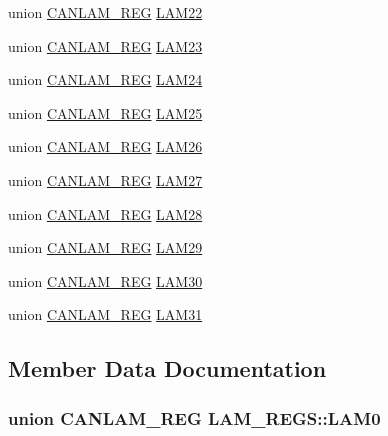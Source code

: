 \begin{DoxyCompactItemize}
\item 
union \hyperlink{union_c_a_n_l_a_m___r_e_g}{C\+A\+N\+L\+A\+M\+\_\+\+R\+E\+G} \hyperlink{struct_l_a_m___r_e_g_s_a5d4097e9a5e27410616af82cd72f3792}{L\+A\+M22}
\item 
union \hyperlink{union_c_a_n_l_a_m___r_e_g}{C\+A\+N\+L\+A\+M\+\_\+\+R\+E\+G} \hyperlink{struct_l_a_m___r_e_g_s_ab6407b6a2bb332f8d3a0170146206432}{L\+A\+M23}
\item 
union \hyperlink{union_c_a_n_l_a_m___r_e_g}{C\+A\+N\+L\+A\+M\+\_\+\+R\+E\+G} \hyperlink{struct_l_a_m___r_e_g_s_a76643c85fd7030cd2daefac17493515e}{L\+A\+M24}
\item 
union \hyperlink{union_c_a_n_l_a_m___r_e_g}{C\+A\+N\+L\+A\+M\+\_\+\+R\+E\+G} \hyperlink{struct_l_a_m___r_e_g_s_a4e4d712c5c62476fecb29037c0195af9}{L\+A\+M25}
\item 
union \hyperlink{union_c_a_n_l_a_m___r_e_g}{C\+A\+N\+L\+A\+M\+\_\+\+R\+E\+G} \hyperlink{struct_l_a_m___r_e_g_s_a73fbf03a4830bf03dc435bde77df4862}{L\+A\+M26}
\item 
union \hyperlink{union_c_a_n_l_a_m___r_e_g}{C\+A\+N\+L\+A\+M\+\_\+\+R\+E\+G} \hyperlink{struct_l_a_m___r_e_g_s_ad13a0dad0f417c1a0b8eef18da499053}{L\+A\+M27}
\item 
union \hyperlink{union_c_a_n_l_a_m___r_e_g}{C\+A\+N\+L\+A\+M\+\_\+\+R\+E\+G} \hyperlink{struct_l_a_m___r_e_g_s_a147e9ba66769dedae739dc7704803001}{L\+A\+M28}
\item 
union \hyperlink{union_c_a_n_l_a_m___r_e_g}{C\+A\+N\+L\+A\+M\+\_\+\+R\+E\+G} \hyperlink{struct_l_a_m___r_e_g_s_a33e2c3bcb2623ca8febf9d5004e14bfe}{L\+A\+M29}
\item 
union \hyperlink{union_c_a_n_l_a_m___r_e_g}{C\+A\+N\+L\+A\+M\+\_\+\+R\+E\+G} \hyperlink{struct_l_a_m___r_e_g_s_ae2dd05cb0f44d12a81bb167d8ffd94fc}{L\+A\+M30}
\item 
union \hyperlink{union_c_a_n_l_a_m___r_e_g}{C\+A\+N\+L\+A\+M\+\_\+\+R\+E\+G} \hyperlink{struct_l_a_m___r_e_g_s_a9aa45554841797b222a5479e5a3fad53}{L\+A\+M31}
\end{DoxyCompactItemize}


\subsection{Member Data Documentation}
\hypertarget{struct_l_a_m___r_e_g_s_ad33be018f43ca32c9f563833d1e6d778}{}
\subsubsection[{L\+A\+M0}]{\setlength{\rightskip}{0pt plus 5cm}union {\bf C\+A\+N\+L\+A\+M\+\_\+\+R\+E\+G} L\+A\+M\+\_\+\+R\+E\+G\+S\+::\+L\+A\+M0}\label{struct_l_a_m___r_e_g_s_ad33be018f43ca32c9f563833d1e6d778}
\hypertarget{struct_l_a_m___r_e_g_s_a94f06455b4e1fbb157e168e9cf4f6972}{}
